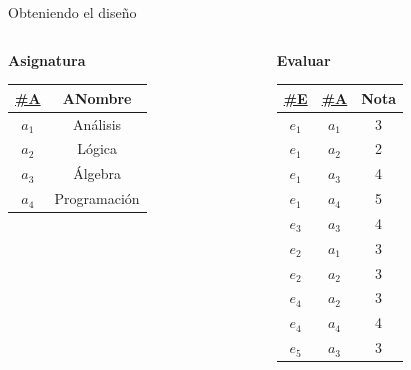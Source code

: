 \begin{frame}{Obteniendo el dise\~no}
\begin{columns}[T]
\begin{column}{0.68\linewidth}
\begin{columns}[T]
            \end{columns}

            \begin{center}
                \textbf{Asignatura}\\[2mm]

                \begin{tabular}{cc}
                    \underline{\#A} & ANombre\\[1mm]
                    \hline
                    $a_1$ & An\'alisis\\
                    $a_2$ & L\'ogica \\
                    $a_3$ & \'Algebra\\
                    $a_4$ & Programaci\'on
                    
                \end{tabular}
            \end{center}
            
        \end{column}

        \begin{column}{0.3\linewidth}
            \vspace{6mm}
            \begin{center}
                \textbf{Evaluar}\\[2mm]

                \begin{tabular}{ccc}
                    \underline{\#E} & \underline{\#A} & Nota\\[1mm]
                    \hline
                    $e_1$ & $a_1$ & 3\\
                    $e_1$ & $a_2$ & 2\\
                    $e_1$ & $a_3$ & 4\\
                    $e_1$ & $a_4$ & 5\\
                    $e_3$ & $a_3$ & 4\\
                    $e_2$ & $a_1$ & 3\\
                    $e_2$ & $a_2$ & 3\\
                    $e_4$ & $a_2$ & 3\\
                    $e_4$ & $a_4$ & 4\\
                    $e_5$ & $a_3$ & 3\\
                \end{tabular}
            \end{center}
        \end{column}
    \end{columns}
\end{frame}


